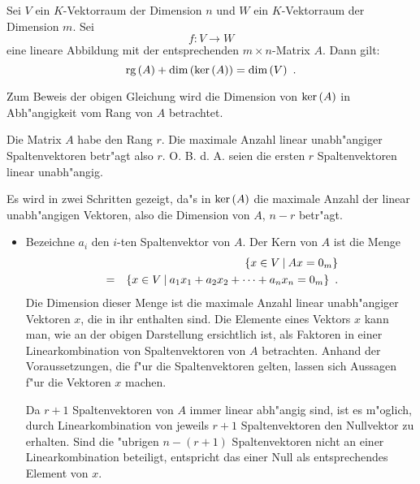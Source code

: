 \begin{lemma}
\label{SatzDimKer}
    Sei $V$ ein $K$-Vektorraum der Dimension $n$ und
    $W$ ein $K$-Vektorraum der Dimension $m$. Sei
    \[ f: V \rightarrow W \] eine lineare Abbildung mit der
    entsprechenden $m \times n$-Matrix $A$. Dann gilt:
    \[ \mbox{\rm rg} \,(A) + \mbox{\rm dim} \,(\mbox{\rm ker} \,(A)) = \mbox{\rm dim} \,(V) \mbox{\hspace{0.5em}.} \]
\end{lemma}
\begin{beweis}
    Zum Beweis der obigen Gleichung wird die Dimension von 
    $\mbox{\rm ker} \,(A)$ in Abh"angigkeit vom Rang von $A$ betrachtet.

    Die Matrix $A$ habe den Rang $r$. Die maximale Anzahl linear
    unabh"angiger Spaltenvektoren betr"agt also $r$. O. B. d. A. seien
    die ersten $r$ Spaltenvektoren linear unabh"angig.
    
    Es wird in zwei Schritten gezeigt, da"s in $\mbox{\rm ker} \,(A)$ die maximale 
    Anzahl der linear unabh"angigen Vektoren, also die Dimension von $A$,
    $n-r$ betr"agt.
    
    \begin{itemize}
    \item Bezeichne $a_i$ den $i$-ten Spaltenvektor von $A$. Der Kern 
          von $A$ ist die Menge
          \begin{eqnarray*}
              & & \{ x \in V \: | \: A x = 0_m \} \\
              & = & \{ x \in V \: | \:
               a_1 x_1 + a_2 x_2 + \cdots + a_n x_n = 0_m \} \mbox{\hspace{0.5em}.}
          \end{eqnarray*}
          Die Dimension dieser Menge ist die maximale Anzahl linear
          unabh"angiger Vektoren $x$, die in ihr enthalten sind. Die
          Elemente eines Vektors $x$ kann man, wie an der obigen
          Darstellung ersichtlich ist, als Faktoren in einer
          Linearkombination von Spaltenvektoren von $A$ betrachten.
          Anhand der Voraussetzungen, die f"ur die Spaltenvektoren
          gelten, lassen sich Aussagen f"ur die Vektoren $x$ machen.
          
          Da $r+1$
          Spaltenvektoren von $A$ immer linear abh"angig sind, ist es
          m"oglich, durch Linearkombination von jeweils $r+1$ 
          Spaltenvektoren den Nullvektor zu erhalten. Sind die "ubrigen 
          $n-(r+1)$ Spaltenvektoren nicht an einer Linearkombination 
          beteiligt, entspricht das einer Null als entsprechendes Element 
          von $x$.
          

\end{itemize}
\end{beweis}
